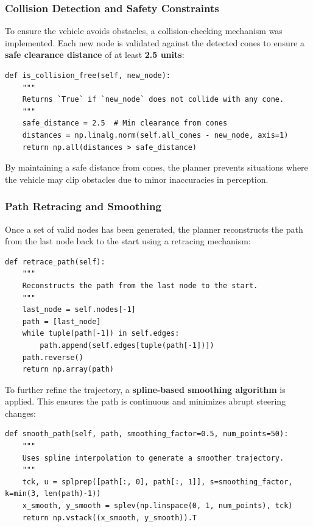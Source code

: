 \documentclass[a4paper,11pt]{report}
\begin{document}
\subsubsection{Collision Detection and Safety Constraints}
To ensure the vehicle avoids obstacles, a collision-checking mechanism was implemented. Each new node is validated against the detected cones to ensure a \textbf{safe clearance distance} of at least \textbf{2.5 units}:

\begin{verbatim}
def is_collision_free(self, new_node):
    """
    Returns `True` if `new_node` does not collide with any cone.
    """
    safe_distance = 2.5  # Min clearance from cones
    distances = np.linalg.norm(self.all_cones - new_node, axis=1)
    return np.all(distances > safe_distance)
\end{verbatim}

By maintaining a safe distance from cones, the planner prevents situations where the vehicle may clip obstacles due to minor inaccuracies in perception.

\subsubsection{Path Retracing and Smoothing}
Once a set of valid nodes has been generated, the planner reconstructs the path from the last node back to the start using a retracing mechanism:

\begin{verbatim}
def retrace_path(self):
    """
    Reconstructs the path from the last node to the start.
    """
    last_node = self.nodes[-1]
    path = [last_node]
    while tuple(path[-1]) in self.edges:
        path.append(self.edges[tuple(path[-1])])
    path.reverse()
    return np.array(path)
\end{verbatim}

To further refine the trajectory, a \textbf{spline-based smoothing algorithm} is applied. This ensures the path is continuous and minimizes abrupt steering changes:

\begin{verbatim}
def smooth_path(self, path, smoothing_factor=0.5, num_points=50):
    """
    Uses spline interpolation to generate a smoother trajectory.
    """
    tck, u = splprep([path[:, 0], path[:, 1]], s=smoothing_factor, k=min(3, len(path)-1))  
    x_smooth, y_smooth = splev(np.linspace(0, 1, num_points), tck)
    return np.vstack((x_smooth, y_smooth)).T
\end{verbatim}
\end{document}
